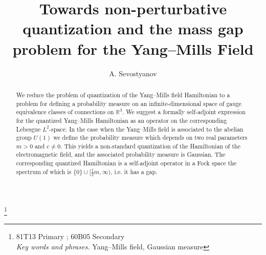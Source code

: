 \documentclass{amsart}
\begin{document}
\newcommand{\nc}{\newcommand}

\nc{\pr}{\noindent{\em Proof. }}
\nc{\g}{\mathfrak g}
\renewcommand{\k}{\mathfrak k}
\nc{\A}{\mathcal A}
\nc{\F}{\mathcal F}
\renewcommand{\H}{\mathfrak H}


\newtheorem{theorem}{Theorem}{}
\newtheorem{lemma}[theorem]{Lemma}{}
\newtheorem{corollary}[theorem]{Corollary}{}
\newtheorem{conjecture}[theorem]{Conjecture}{}
\newtheorem{proposition}[theorem]{Proposition}{}
\newtheorem{axiom}{Axiom}{}
\newtheorem{remark}[theorem]{Remark}{}
\newtheorem{example}{Example}{}
\newtheorem{exercise}{Exercise}{}
\newtheorem{definition}{Definition}{}





\renewcommand{\theremark}{}

\renewcommand{\thedefinition}{\arabic{definition}}


\title{Towards non-perturbative quantization and the mass gap problem for the Yang--Mills Field}

\author[A. Sevostyanov]{A. Sevostyanov}

\address{Institute of Pure and Applied Mathematics,
University of Aberdeen \\ Aberdeen AB24 3UE, United Kingdom \\ e-mail: a.sevastyanov@abdn.ac.uk }


\thanks{  81T13  Primary ;  60B05 Secondary \\
{\em Key words and phrases.} Yang--Mills field, Gaussian measure}

\begin{abstract}
We reduce the problem of quantization of the Yang--Mills field Hamiltonian to a problem for defining a probability measure on an infinite-dimensional space of gauge equivalence classes of connections on $\mathbb{R}^3$. We suggest a formally self-adjoint expression for the quantized Yang--Mills Hamiltonian as an operator on the  corresponding Lebesgue $L^2$-space. In the case when the Yang--Mills field is associated to the abelian group $U(1)$ we define the probability measure which depends on two real parameters $m>0$ and $c\neq 0$. This yields a non-standard quantization of the Hamiltonian of the electromagnetic field, and the associated probability measure is Gaussian. The corresponding quantized Hamiltonian is a self-adjoint operator in a Fock space the spectrum of which is $\{0\}\cup[\frac12m, \infty)$, i.e. it has a gap.
\end{abstract}
\end{document}
